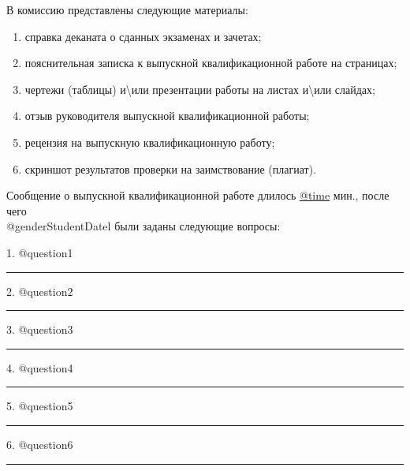\documentclass[a4paper,12pt]{article} %
\begin{document}
\hspace{-0.25cm}В комиссию представлены следующие материалы:
\vspace{-0.25cm}
\begin{enumerate}	
	\item  	справка деканата о сданных экзаменах и зачетах;
	\vspace{-0.3cm}
	\item  	пояснительная записка к выпускной квалификационной работе на \makebox[10mm]{\hrulefill} страницах;
	\vspace{-0.3cm}
	\item   чертежи (таблицы) и\textbackslash{}или презентации работы на \makebox[10mm]{\hrulefill}		 листах и\textbackslash{}или 	\makebox[10mm]{\hrulefill}		слайдах;
	\vspace{-0.3cm}
	\item 	отзыв руководителя выпускной квалификационной работы;
	\vspace{-0.3cm}
	\item	рецензия на выпускную квалификационную работу;
	\vspace{-0.3cm}
	\item  	скриншот результатов проверки на заимствование (плагиат).
\end{enumerate}

\hspace{-0.15cm}Сообщение о выпускной квалификационной работе длилось \underline{@time} мин., после чего\\
 @genderStudentDatel были заданы следующие вопросы:\\
\vspace{-0.5cm} 
\begin{flushleft}
	  	1. @question1
	  	\smallskip\hrule
	  	\vspace{0.2cm} 
	  	2. @question2
	  	\smallskip\hrule
	  	\vspace{0.2cm}
	  	3. @question3
	  	\smallskip\hrule
	  	\vspace{0.2cm} 
	  	4. @question4
	  	\smallskip\hrule
	  	\vspace{0.2cm} 
	  	5. @question5
	  	\smallskip\hrule
	  	\vspace{0.2cm} 
	  	6. @question6
	  	\smallskip\hrule
	  	\vspace{0.2cm} 	 	
	  	
\end{flushleft}

\pagebreak

\hfill \break
\hfill \break
\thispagestyle{empty}
 
\end{document}
